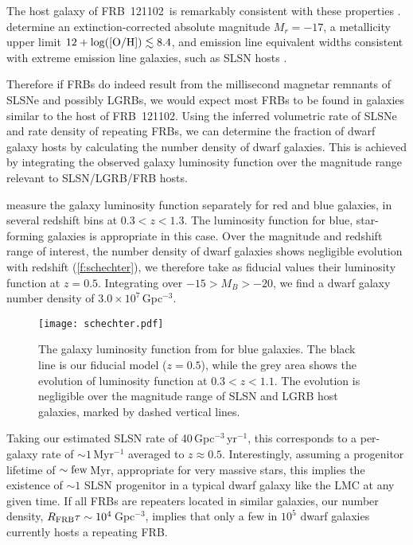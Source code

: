 \documentclass[twocolumn]{aastex6}
\newcommand{\pergpcperyr}{Gpc$^{-3}$\,yr$^{-1}$}
\newcommand{\repeater}{FRB~121102}
\begin{document}
The host galaxy of \repeater\ is remarkably consistent with these properties \citep{mbm.2017}.  \citet{tbc+.2017} determine an extinction-corrected absolute magnitude $M_r=-17$, a metallicity upper limit $12+\log ([{\rm O/H}])\lesssim 8.4$, and emission line equivalent widths consistent with extreme emission line galaxies, such as SLSN hosts \citep{lel2015,schu2016}.

Therefore if FRBs do indeed result from the millisecond magnetar remnants of SLSNe and possibly LGRBs, we would expect most FRBs to be found in galaxies similar to the host of \repeater.  Using the inferred volumetric rate of SLSNe and rate density of repeating FRBs, we can determine the fraction of dwarf galaxy hosts by calculating the number density of dwarf galaxies. This is achieved by integrating the observed galaxy luminosity function over the magnitude range relevant to SLSN/LGRB/FRB hosts.

\citet{fab2007} measure the galaxy luminosity function separately for red and blue galaxies, in several redshift bins at $0.3<z<1.3$. The luminosity function for blue, star-forming galaxies is appropriate in this case. Over the magnitude and redshift range of interest, the number density of dwarf galaxies shows negligible evolution with redshift (\autoref{f:schechter}), we therefore take as fiducial values their luminosity function at $z=0.5$. Integrating over $-15>M_B>-20$, we find a dwarf galaxy number density of $3.0\times 10^7$\,Gpc$^{-3}$.

\begin{figure}
\texttt{[image: schechter.pdf]}
\caption{The galaxy luminosity function from \citet{fab2007} for blue galaxies. The black line is our fiducial model ($z=0.5$), while the grey area shows the evolution of luminosity function at $0.3<z<1.1$. The evolution is negligible over the magnitude range of SLSN and LGRB host galaxies, marked by dashed vertical lines.}
\label{f:schechter}
\end{figure}

Taking our estimated SLSN rate of 40\,\pergpcperyr, this corresponds to a per-galaxy rate of $\sim 1$\,Myr$^{-1}$ averaged to $z\approx 0.5$.  Interestingly, assuming a progenitor lifetime of $\sim {\rm few}$\,Myr, appropriate for very massive stars, this implies the existence of $\sim 1$ SLSN progenitor in a typical dwarf galaxy like the LMC at any given time. If all FRBs are repeaters located in similar galaxies, our number density, $R_{\rm FRB}\tau \sim 10^4$\,Gpc$^{-3}$, implies that only a few in $10^5$ dwarf galaxies currently hosts a repeating FRB.
\end{document}
